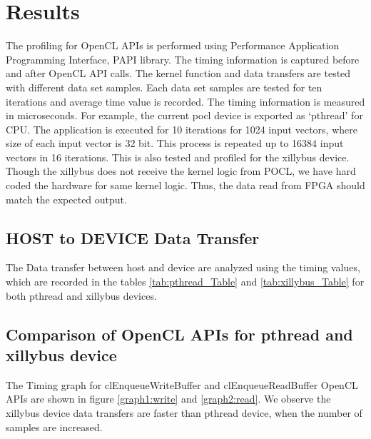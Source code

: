 \section{Results}
The profiling for OpenCL APIs is performed using Performance Application Programming Interface, PAPI library. The timing information is captured before and after OpenCL API calls. The kernel function and data transfers are tested with different data set samples. Each data set samples are tested for ten iterations and average time value is recorded. The timing information is measured in microseconds. For example, the current pocl device is exported as ‘pthread’ for CPU. The application is executed for 10 iterations for 1024 input vectors, where size of each input vector is 32 bit. This process is repeated up to 16384 input vectors in 16 iterations. This is also tested and profiled for the xillybus device. Though the xillybus does not receive the kernel logic from POCL, we have hard coded the hardware for same kernel logic. Thus, the data read from FPGA should match the expected output. 

\subsection{HOST to DEVICE Data Transfer}
The Data transfer between host and device are analyzed using the timing values, which are recorded in the tables \ref{tab:pthread_Table} and \ref{tab:xillybus_Table} for both pthread and xillybus devices.



\subsection{Comparison of OpenCL APIs for pthread and xillybus device}
The Timing graph for clEnqueueWriteBuffer and clEnqueueReadBuffer OpenCL APIs are shown in figure \ref{graph1:write} and \ref{graph2:read}. We observe the xillybus device data transfers are faster than pthread device, when the number of samples are increased.

